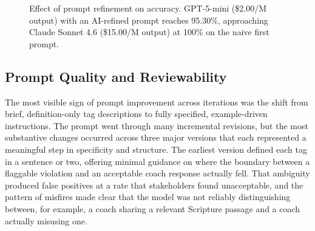 \documentclass[12pt]{article}
\begin{document}
    \begin{figure}[H]
        \centering
        \caption{Effect of prompt refinement on accuracy. GPT-5-mini (\$2.00/M output) with an AI-refined prompt reaches 95.30\%, approaching Claude Sonnet 4.6 (\$15.00/M output) at 100\% on the naive first prompt.}
        \label{fig:prompt-refinement}
    \end{figure}

	\subsection{Prompt Quality and Reviewability}

   The most visible sign of prompt improvement across iterations was the shift from brief, definition-only tag descriptions to fully specified, example-driven instructions. The prompt went through many incremental revisions, but the most substantive changes occurred across three major versions that each represented a meaningful step in specificity and structure. The earliest version defined each tag in a sentence or two, offering minimal guidance on where the boundary between a flaggable violation and an acceptable coach response actually fell. That ambiguity produced false positives at a rate that stakeholders found unacceptable, and the pattern of misfires made clear that the model was not reliably distinguishing between, for example, a coach sharing a relevant Scripture passage and a coach actually misusing one.
		
\end{document}
